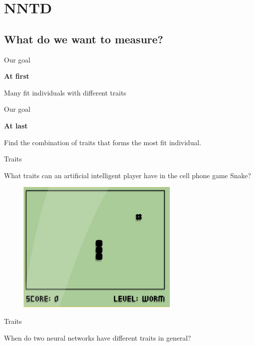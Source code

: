 \section{NNTD}
\subsection{What do we want to measure?}
\begin{frame}{Our goal}
\begin{center}
\textbf{At first}

Many fit individuals with different traits
\end{center}
\end{frame}

\begin{frame}{Our goal}
\begin{center}
\textbf{At last}

Find the combination of traits that forms the most fit individual.
\end{center}
\end{frame}

\begin{frame}{Traits}
\begin{center}
  What traits can an artificial intelligent player have in the cell phone game Snake?
  \begin{figure}[p]
  \includegraphics[width=0.7\textwidth]{images/snake.jpg}
  \end{figure}
  \end{center}
\end{frame}

\begin{frame}{Traits}
\begin{center}
  When do two neural networks have different traits in general?
  \end{center}
\end{frame}

